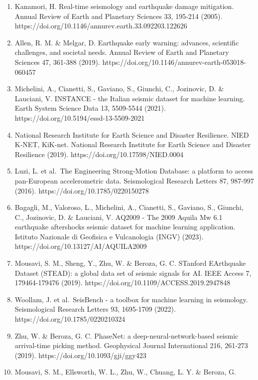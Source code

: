 \documentclass[
  10pt,
]{article}
\begin{document}
\begin{enumerate}
\def\labelenumi{\arabic{enumi}.}
\item
  Kanamori, H. Real-time seismology and earthquake damage mitigation.
  Annual Review of Earth and Planetary Sciences 33, 195-214 (2005).
  https://doi.org/10.1146/annurev.earth.33.092203.122626
\item
  Allen, R. M. \& Melgar, D. Earthquake early warning: advances,
  scientific challenges, and societal needs. Annual Review of Earth and
  Planetary Sciences 47, 361-388 (2019).
  https://doi.org/10.1146/annurev-earth-053018-060457
\item
  Michelini, A., Cianetti, S., Gaviano, S., Giunchi, C., Jozinovic, D.
  \& Lauciani, V. INSTANCE - the Italian seismic dataset for machine
  learning. Earth System Science Data 13, 5509-5544 (2021).
  https://doi.org/10.5194/essd-13-5509-2021
\item
  National Research Institute for Earth Science and Disaster Resilience.
  NIED K-NET, KiK-net. National Research Institute for Earth Science and
  Disaster Resilience (2019). https://doi.org/10.17598/NIED.0004
\item
  Luzi, L. et al.~The Engineering Strong-Motion Database: a platform to
  access pan-European accelerometric data. Seismological Research
  Letters 87, 987-997 (2016). https://doi.org/10.1785/0220150278
\item
  Bagagli, M., Valoroso, L., Michelini, A., Cianetti, S., Gaviano, S.,
  Giunchi, C., Jozinovic, D. \& Lauciani, V. AQ2009 - The 2009 Aquila Mw
  6.1 earthquake aftershocks seismic dataset for machine learning
  application. Istituto Nazionale di Geofisica e Vulcanologia (INGV)
  (2023). https://doi.org/10.13127/AI/AQUILA2009
\item
  Mousavi, S. M., Sheng, Y., Zhu, W. \& Beroza, G. C. STanford
  EArthquake Dataset (STEAD): a global data set of seismic signals for
  AI. IEEE Access 7, 179464-179476 (2019).
  https://doi.org/10.1109/ACCESS.2019.2947848
\item
  Woollam, J. et al.~SeisBench - a toolbox for machine learning in
  seismology. Seismological Research Letters 93, 1695-1709 (2022).
  https://doi.org/10.1785/0220210324
\item
  Zhu, W. \& Beroza, G. C. PhaseNet: a deep-neural-network-based seismic
  arrival-time picking method. Geophysical Journal International 216,
  261-273 (2019). https://doi.org/10.1093/gji/ggy423
\item
  Mousavi, S. M., Ellsworth, W. L., Zhu, W., Chuang, L. Y. \& Beroza, G.

\end{enumerate}
\end{document}
